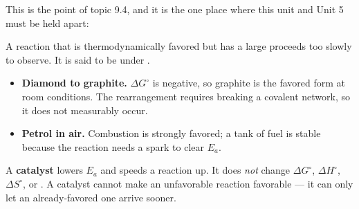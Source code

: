\documentclass{apchem-notes}
\begin{document}

This is the point of topic 9.4, and it is the one place where this unit and
Unit 5 must be held apart:

\begin{center}
\end{center}

A reaction that is thermodynamically favored but has a large
 proceeds too slowly to observe. It is
said to be under .

\begin{itemize}[leftmargin=*,itemsep=0.3em]
  \item \textbf{Diamond to graphite.} $\Delta G^\circ$ is negative, so
        graphite is the favored form at room conditions. The rearrangement
        requires breaking a covalent network, so it does not measurably
        occur.
  \item \textbf{Petrol in air.} Combustion is strongly favored; a tank of
        fuel is stable because the reaction needs a spark to clear
        $E_a$.
\end{itemize}

\begin{apctrap}
A \textbf{catalyst} lowers $E_a$ and speeds a reaction up. It does
\emph{not} change $\Delta G^\circ$, $\Delta H^\circ$, $\Delta S^\circ$, or
. A catalyst cannot make an unfavorable reaction
favorable --- it can only let an already-favored one arrive sooner.
\end{apctrap}

\end{document}
